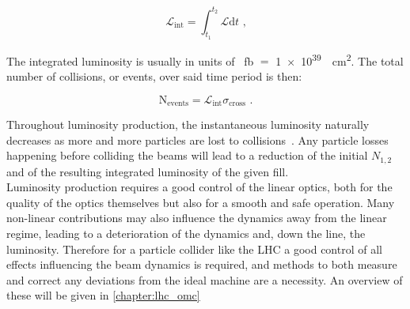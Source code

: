 \begin{equation}
    \mathcal{L}_{\mathrm{int}} = \int_{t_1}^{t_2} \mathcal{L} \mathrm{d}t \text{ ,}
    \label{equation:integrated_luminosity}
\end{equation}

The integrated luminosity is usually in units of \unit{\per\femto\barn} \(=\) \qty{1e39}{\per\square\centi\meter}.
The total number of collisions, or events, over said time period is then:

\begin{equation}
    \mathrm{N_{events}} = \mathcal{L}_{\mathrm{int}} \sigma_{\mathrm{cross}} \text{ .}
    \label{equation:total_number_collisions}
\end{equation}

Throughout luminosity production, the instantaneous luminosity naturally decreases as more and more particles are lost to collisions~\cite{PRES:Hostettler:LHC_Lumi_Lifetime}.
Any particle losses happening before colliding the beams will lead to a reduction of the initial \(N_{1,2}\) and of the resulting integrated luminosity of the given fill.\\

Luminosity production requires a good control of the linear optics, both for the quality of the optics themselves but also for a smooth and safe operation.
Many non-linear contributions may also influence the dynamics away from the linear regime, leading to a deterioration of the dynamics and, down the line, the luminosity.
Therefore for a particle collider like the LHC a good control of all effects influencing the beam dynamics is required, and methods to both measure and correct any deviations from the ideal machine are a necessity.
An overview of these will be given in \cref{chapter:lhc_omc}

